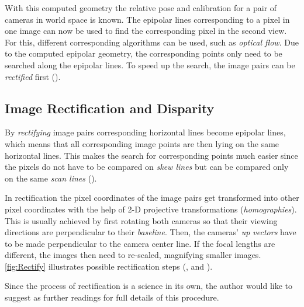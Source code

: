 With this computed geometry the relative pose and calibration for a pair of cameras in world space is known. The epipolar lines corresponding to a pixel in one image can now be used to find the corresponding pixel in the second view. For this, different corresponding algorithms can be used, such as \textit{optical flow}. Due to the computed epipolar geometry, the corresponding points only need to be searched along the epipolar lines. To speed up the search, the image pairs can be \textit{rectified} first (\cite[p.472 et seq.]{Szeliski.2011}).

\subsection{Image Rectification and Disparity}
By \textit{rectifying} image pairs corresponding horizontal lines become epipolar lines, which means that all corresponding image points are then lying on the same horizontal lines. This makes the search for corresponding points much easier since the pixels do not have to be compared on \textit{skew lines} but can be compared only on the same \textit{scan lines} (\cite[p.1]{Loop.2001}).


In rectification the pixel coordinates of the image pairs get transformed into other pixel coordinates with the help of 2-D projective transformations (\textit{homographies}). This is usually achieved by first rotating both cameras so that their viewing directions are perpendicular to their \textit{baseline}. Then, the cameras' \textit{up vectors} have to be made perpendicular to the camera center line. If the focal lengths are different, the images then need to re-scaled, magnifying smaller images. \autoref{fig:Rectify} illustrates possible rectification steps (\cite[p.1]{Loop.2001}, \cite[p.473]{Szeliski.2011} and \cite[p.436]{Luhmann.2014}).

Since the process of rectification is a science in its own, the author would like to suggest \cite{Loop.2001} as further readings for full details of this procedure.

